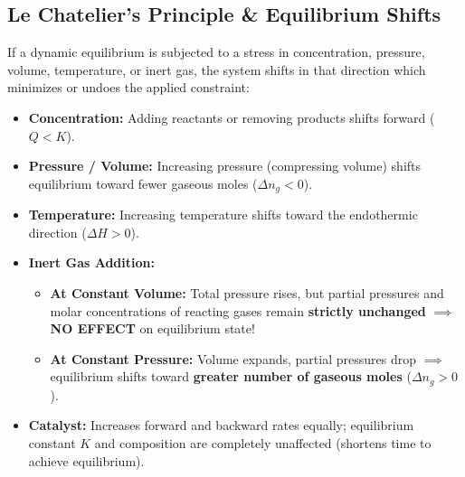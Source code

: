 \documentclass[10pt,twoside,openright]{book}
\begin{document}
\subsection{Le Chatelier's Principle \& Equilibrium Shifts}
If a dynamic equilibrium is subjected to a stress in concentration, pressure, volume, temperature, or inert gas, the system shifts in that direction which minimizes or undoes the applied constraint:
\begin{itemize}
  \item \textbf{Concentration:} Adding reactants or removing products shifts forward ($Q < K$).
  \item \textbf{Pressure / Volume:} Increasing pressure (compressing volume) shifts equilibrium toward fewer gaseous moles ($\Delta n_g < 0$).
  \item \textbf{Temperature:} Increasing temperature shifts toward the endothermic direction ($\Delta H > 0$).
  \item \textbf{Inert Gas Addition:}
  \begin{itemize}
    \item \textbf{At Constant Volume:} Total pressure rises, but partial pressures and molar concentrations of reacting gases remain \textbf{strictly unchanged} $\implies$ \textbf{NO EFFECT} on equilibrium state!
    \item \textbf{At Constant Pressure:} Volume expands, partial pressures drop $\implies$ equilibrium shifts toward \textbf{greater number of gaseous moles} ($\Delta n_g > 0$).
  \end{itemize}
  \item \textbf{Catalyst:} Increases forward and backward rates equally; equilibrium constant $K$ and composition are completely unaffected (shortens time to achieve equilibrium).
\end{itemize}
\end{document}
